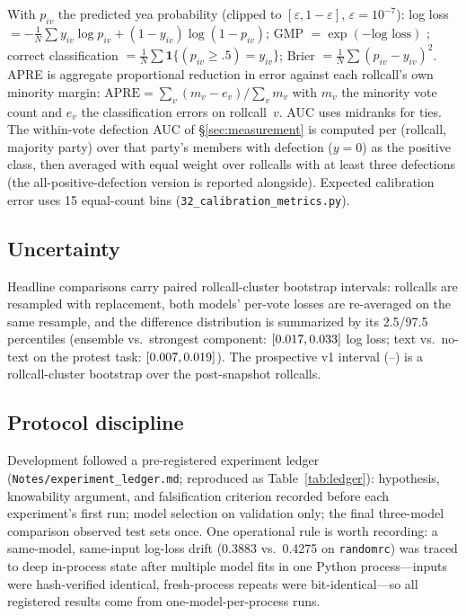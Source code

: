 \documentclass[11pt]{article}
\newcommand{\code}[1]{\texttt{#1}}
\begin{document}
With $p_{iv}$ the predicted yea probability (clipped to
$[\varepsilon, 1-\varepsilon]$, $\varepsilon = 10^{-7}$): log loss
$= -\frac{1}{N}\sum y_{iv}\log p_{iv} + (1-y_{iv})\log(1-p_{iv})$;
GMP $= \exp(-\text{log loss})$ \citep{carroll2013structure}; correct
classification $= \frac{1}{N}\sum \mathbf{1}\{(p_{iv} \ge .5) =
y_{iv}\}$; Brier $= \frac{1}{N}\sum (p_{iv}-y_{iv})^2$. APRE is
aggregate proportional reduction in error against each rollcall's own
minority margin: $\text{APRE} = \sum_v (m_v - e_v) / \sum_v m_v$ with
$m_v$ the minority vote count and $e_v$ the classification errors on
rollcall~$v$. AUC uses midranks for ties. The within-vote defection AUC
of \S\ref{sec:measurement} is computed per (rollcall, majority party)
over that party's members with defection ($y=0$) as the positive class,
then averaged with equal weight over rollcalls with at least three
defections (the all-positive-defection version is reported alongside).
Expected calibration error uses 15 equal-count bins
(\code{32\_calibration\_metrics.py}).

\subsection{Uncertainty}

Headline comparisons carry paired rollcall-cluster bootstrap intervals:
rollcalls are resampled with replacement, both models' per-vote losses
are re-averaged on the same resample, and the difference distribution is
summarized by its 2.5/97.5 percentiles (ensemble vs.\ strongest
component: $[0.017, 0.033]$ log loss; text vs.\
no-text on the protest task: $[0.007, 0.019]$).
The prospective v1 interval (\prospLLlo--\prospLLhi) is a
rollcall-cluster bootstrap over the post-snapshot rollcalls.

\subsection{Protocol discipline}

Development followed a pre-registered experiment ledger
(\code{Notes/experiment\_ledger.md}; reproduced as
Table~\ref{tab:ledger}): hypothesis, knowability argument, and
falsification criterion recorded before each experiment's first run;
model selection on validation only; the final three-model comparison
observed test sets once. One operational rule is worth recording: a
same-model, same-input log-loss drift (0.3883 vs.\ 0.4275 on
\code{randomrc}) was traced to deep in-process state after multiple
model fits in one Python process---inputs were hash-verified identical,
fresh-process repeats were bit-identical---so all registered results
come from one-model-per-process runs.
\end{document}
